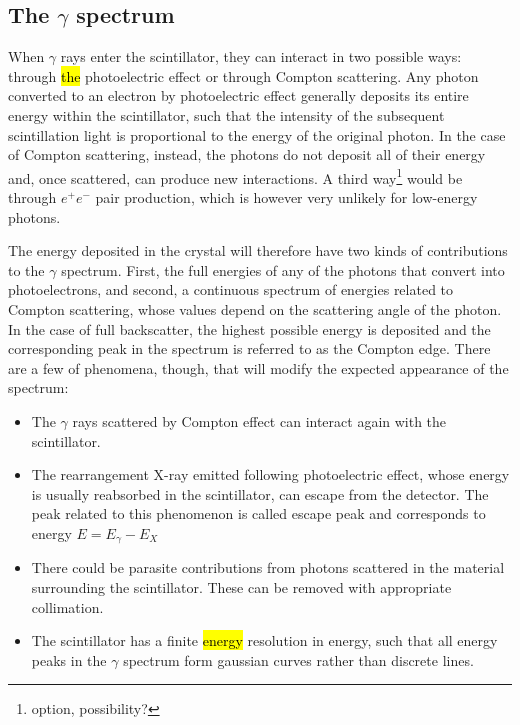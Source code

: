 
\subsection{The $\gamma$ spectrum}
\label{sec:spectrum}

When $\gamma$ rays enter the scintillator, they can interact in two possible ways: through \hl{the} photoelectric effect or through Compton scattering.
Any photon converted to an electron by photoelectric effect generally deposits its entire energy within the scintillator, such that the intensity of the subsequent scintillation light is proportional to the energy of the original photon.
In the case of Compton scattering, instead, the photons do not deposit all of their energy and, once scattered, can produce new interactions.
A third way\footnote{option, possibility?} would be through $e^+ e^-$ pair production, which is however very unlikely for low-energy photons.

The energy deposited in the crystal will therefore have two kinds of contributions to the $\gamma$ spectrum.
First, the full energies of any of the photons that convert into photoelectrons, and 
second, a continuous spectrum of energies related to Compton scattering, 
whose values depend on the scattering angle of the photon.
In the case of full backscatter, the highest possible energy is deposited
and the corresponding peak in the spectrum is referred to as the Compton edge.
There are a few of phenomena, though, that will modify the expected appearance of the spectrum:
\begin{itemize}
    \item The $\gamma$ rays scattered by Compton effect can interact again with the scintillator.
    \item The rearrangement X-ray emitted following photoelectric effect, whose energy is usually reabsorbed in the scintillator, can escape from the detector.
    The peak related to this phenomenon is called escape peak and corresponds to energy $E = E_{\gamma} - E_X$
    \item There could be parasite contributions from photons scattered in the material surrounding the scintillator. 
    These can be removed with appropriate collimation.
    \item The scintillator has a finite \hl{energy} resolution in energy, such that all energy peaks in the $\gamma$ spectrum form gaussian curves rather than discrete lines.
\end{itemize}

